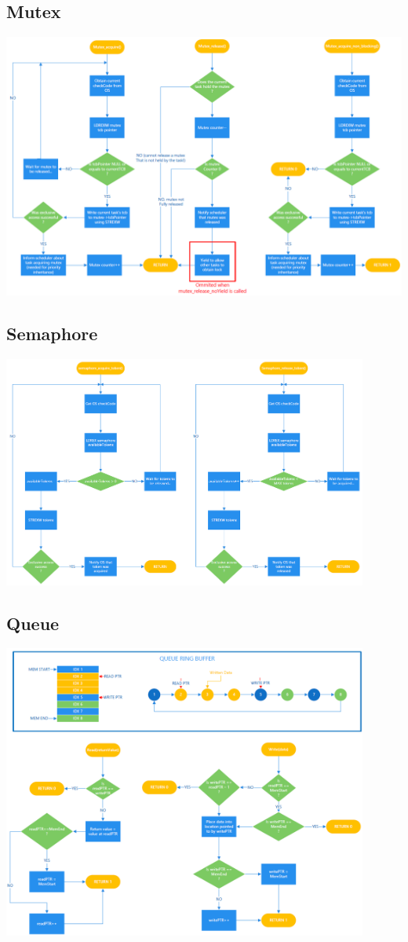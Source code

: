 \documentclass[12pt,a4paper]{article}
\begin{document}
\subsection{Mutex}
\includegraphics[width=1\textwidth]{images/Mutex.png}\\
\subsection{Semaphore}
\includegraphics[width=0.9\textwidth]{images/Semaphore.png}
\subsection{Queue}
\includegraphics[width=0.9\textwidth]{images/Queue.png}\\
\end{document}
